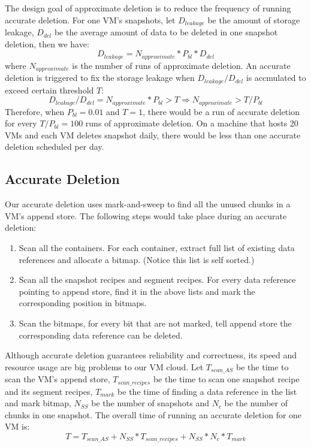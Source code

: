 The design goal of approximate deletion is to reduce the frequency of running accurate deletion.
For one VM's snapshots, let $D_{leakage}$ be the amount of storage leakage, $D_{del}$ be the average amount of data
to be deleted in one snapshot deletion, 
then we have:
\begin{equation}
D_{leakage} = N_{approximate} * P_{bl} * D_{del}
\end{equation}
where $N_{approximate}$ is the number of runs of approximate deletion. 
An accurate deletion is triggered to fix the storage leakage
when $D_{leakage}/D_{del}$ is accmulated to exceed certain threshold $T$:
\begin{equation}
D_{leakage} / D_{del} = N_{approximate} * P_{bl} > T \Rightarrow N_{approximate} > T/P_{bl}
\end{equation}
Therefore, when $P_{bl} = 0.01$ and $T=1$, 
there would be a run of accurate deletion for every $T/P_{bl} = 100$ runs of approximate deletion.
On a machine that hosts 20 VMs and each VM deletes snapshot daily, there would be less than
one accurate deletion scheduled per day.

\subsection{Accurate Deletion}
Our accurate deletion uses mark-and-sweep to find all the unused chunks in a VM's append store.
The following steps would take place during an accurate deletion:

\begin{enumerate}
\item Scan all the containers. For each container, extract full list of existing data references and allocate a bitmap. 
(Notice this list is self sorted.)
\item Scan all the snapshot recipes and segment recipes. For every data reference pointing to append store,
find it in the above lists and mark the corresponding position in bitmaps.
\item Scan the bitmaps, for every bit that are not marked, tell append store the corresponding data reference can be deleted.
\end{enumerate}

Although accurate deletion guarantees reliability and correctness, its speed and resource usage are big problems to our VM cloud.
Let $T_{scan\_AS}$ be the time to scan the VM's append store, $T_{scan\_recipes}$ be the time to scan one snapshot recipe
and its segment recipes, $T_{mark}$ be the time of finding a data reference in the list and mark bitmap, 
$N_{SS}$ be the number of snapshots and $N_c$ be the number of chunks in one snapshot.
The overall time of running an accurate deletion for one VM is:
\begin{equation}
T = T_{scan\_AS} + N_{SS} * T_{scan\_recipes} + N_{SS} * N_c * T_{mark}
\end{equation}

